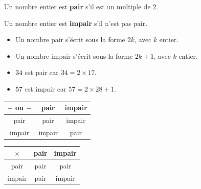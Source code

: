 \begin{definition}[Parité]
	Un nombre entier est \textbf{pair} s'il est un multiple de $2$.

	Un nombre entier est \textbf{impair} s'il n'est pas pair.

	\begin{itemize}
		\item Un nombre pair s'écrit sous la forme $2k$, avec $k$ entier.
		\item Un nombre impair s'écrit sous la forme $2k + 1$, avec $k$ entier.
	\end{itemize}
\end{definition}

\begin{exemple}
	\nline
	\begin{itemize}
		\item $34$ est pair car $34 = 2 \times 17$.
		\item $57$ est impair car $57 = 2 \times 28 + 1$.
	\end{itemize}
\end{exemple}

\begin{propriete}
	\nline
	\begin{center}
		\def\arraystretch{1.4}%
		\begin{tabular}{c|c|c}%
			$+$ ou $-$ & pair   & impair \\
			\hline
			pair       & pair   & impair \\
			impair     & impair & pair   \\
		\end{tabular}
		\qquad\qquad
		\begin{tabular}{c|c|c}%
			$\times$ & pair & impair \\
			\hline
			pair     & pair & pair   \\
			impair   & pair & impair \\
		\end{tabular}
	\end{center}
\end{propriete}

